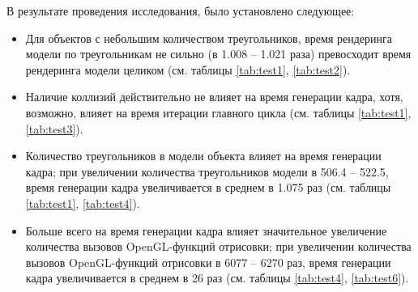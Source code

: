 В результате проведения исследования, было установлено следующее:
\begin{itemize}
    \item Для объектов с небольшим количеством треугольников, время рендеринга модели по треугольникам не сильно (в 1.008 -- 1.021 раза) превосходит время рендеринга модели целиком (см. таблицы \ref{tab:test1}, \ref{tab:test2}).
    \item Наличие коллизий действительно не влияет на время генерации кадра, хотя, возможно, влияет на время итерации главного цикла (см. таблицы \ref{tab:test1}, \ref{tab:test3}).
    \item Количество треугольников в модели объекта влияет на время генерации кадра; при увеличении количества треугольников модели в 506.4 -- 522.5, время генерации кадра увеличивается в среднем в 1.075 раз (см. таблицы \ref{tab:test1}, \ref{tab:test4}).
    \item Больше всего на время генерации кадра влияет значительное увеличение количества вызовов OpenGL-функций отрисовки; при увеличении количества вызовов OpenGL-функций отрисовки в 6077 -- 6270 раз, время генерации кадра увеличивается в среднем в 26 раз (см. таблицы \ref{tab:test4}, \ref{tab:test6}).
\end{itemize}
